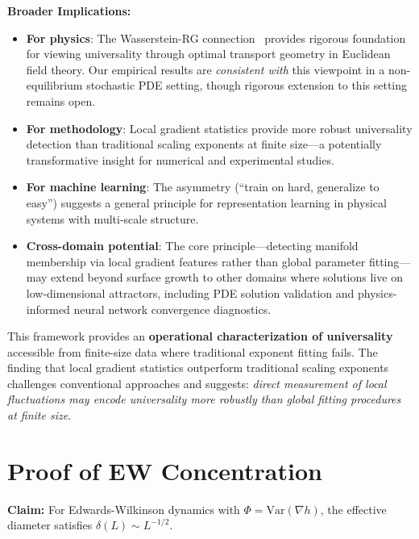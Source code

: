 \documentclass[aps,pre,reprint,amsmath,amssymb,superscriptaddress]{revtex4-2}
\begin{document}
\textbf{Broader Implications:}
\begin{itemize}
\item \textbf{For physics}: The Wasserstein-RG connection~\cite{CotlerRezchikov2023} provides rigorous foundation for viewing universality through optimal transport geometry in Euclidean field theory. Our empirical results are \emph{consistent with} this viewpoint in a non-equilibrium stochastic PDE setting, though rigorous extension to this setting remains open.
\item \textbf{For methodology}: Local gradient statistics provide more robust universality detection than traditional scaling exponents at finite size---a potentially transformative insight for numerical and experimental studies.
\item \textbf{For machine learning}: The asymmetry (``train on hard, generalize to easy'') suggests a general principle for representation learning in physical systems with multi-scale structure.
\item \textbf{Cross-domain potential}: The core principle---detecting manifold membership via local gradient features rather than global parameter fitting---may extend beyond surface growth to other domains where solutions live on low-dimensional attractors, including PDE solution validation and physics-informed neural network convergence diagnostics.
\end{itemize}

This framework provides an \textbf{operational characterization of universality} accessible from finite-size data where traditional exponent fitting fails. The finding that local gradient statistics outperform traditional scaling exponents challenges conventional approaches and suggests: \emph{direct measurement of local fluctuations may encode universality more robustly than global fitting procedures at finite size}.

\begin{acknowledgments}
[To be added]
\end{acknowledgments}

\appendix

\section{Proof of EW Concentration}
\label{app:EW}

\textbf{Claim:} For Edwards-Wilkinson dynamics with $\Phi = \text{Var}(\nabla h)$, the effective diameter satisfies $\delta(L) \sim L^{-1/2}$.
\end{document}
